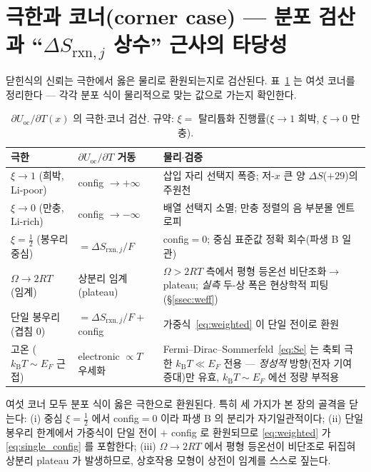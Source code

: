 \documentclass[11pt,a4paper]{article}
\newcommand{\rxn}{\mathrm{rxn}}
\newcommand{\oc}{\mathrm{oc}}
\newcommand{\kB}{k_{\mathrm B}}
\begin{document}
\section{극한과 코너(corner case) — 분포 검산과 ``$\Delta S_{\rxn,j}$ 상수'' 근사의 타당성}\label{sec:limits}
닫힌식의 신뢰는 극한에서 옳은 물리로 환원되는지로 검산된다. 표~\ref{tab:limits} 는 여섯 코너를 정리한다 —
각각 분포 식이 물리적으로 맞는 값으로 가는지 확인한다.

\begin{table}[t]
\centering\small
\renewcommand{\arraystretch}{1.35}
\caption{$\partial U_\oc/\partial T(x)$ 의 극한$\cdot$코너 검산. 규약: $\xi=$ 탈리튬화 진행률($\xi\to1$ 희박, $\xi\to0$ 만충).}
\label{tab:limits}
\begin{tabular}{l l p{}}
\toprule
극한 & $\partial U_\oc/\partial T$ 거동 & 물리$\cdot$검증 \\
\midrule
$\xi\to1$ (희박, Li-poor) & config $\to+\infty$ & 삽입 자리 선택지 폭증; 저-$x$ 큰 양 $\Delta S$($+29$)의 주원천 \\
$\xi\to0$ (만충, Li-rich) & config $\to-\infty$ & 배열 선택지 소멸; 만충 정렬의 음 부분몰 엔트로피 \\
$\xi=\tfrac12$ (봉우리 중심) & $=\Delta S_{\rxn,j}/F$ & config$=0$; 중심 표준값 정확 회수(파생 B 일관) \\
$\Omega\to2RT$ (임계) & 상분리 임계(plateau) & $\Omega>2RT$ 측에서 평형 등온선 비단조화$\to$plateau; \emph{실측} 두-상 폭은 현상학적 피팅(\S\ref{ssec:weff}) \\
단일 봉우리 (겹침 0) & $=\Delta S_{\rxn,j}/F+$ config & 가중식~\eqref{eq:weighted} 이 단일 전이로 환원 \\
고온 ($\kB T\!\sim\!E_F$ 근접) & electronic $\propto T$ 우세화 & Fermi--Dirac--Sommerfeld~\eqref{eq:Se} 는 축퇴 극한 $\kB T\!\ll\!E_F$ 전용 — \emph{정성적} 방향(전자 기여 증대)만 유효, $\kB T\!\sim\!E_F$ 에선 정량 부적용 \\
\bottomrule
\end{tabular}
\end{table}

여섯 코너 모두 분포 식이 옳은 극한으로 환원된다. 특히 세 가지가 본 장의 골격을 닫는다: (i) 중심
$\xi=\tfrac12$ 에서 config$=0$ 이라 파생 B 의 분리가 자기일관적이다; (ii) 단일
봉우리 한계에서 가중식이 단일 전이 $+$ config 로 환원되므로 \eqref{eq:weighted} 가 \eqref{eq:single_config} 를
포함한다; (iii) $\Omega\to2RT$ 에서 평형 등온선이 비단조로 뒤집혀 상분리 plateau 가 발생하므로, 상호작용 모형이
상전이 임계를 스스로 짚는다.
\end{document}
